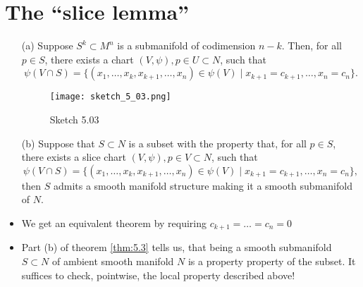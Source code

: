 \section{The ``slice lemma''}

\begin{theorem}\label{thm:5.3}
    \begin{enumerate}
        \item[(a)] Suppose \(S^k\subset M^n\) is a submanifold of codimension \(n-k\).
                   Then, for all \(p\in S\), there exists a chart \((V,\psi),p\in U\subset N\), such that \[\psi(V\cap S)=\{(x_1,\dots,x_k,x_{k+1},\dots,x_n)\in \psi(V)\mid x_{k+1}=c_{k+1},\dots,x_{n}=c_n\}.\]  
        \begin{figure}[H]
            \centering
            \texttt{[image: sketch\_5\_03.png]}
            \caption{Sketch 5.03} 
        \end{figure}
        \item[(b)] Suppose that \(S\subset N\) is a subset with the property that, for all  
                   \(p\in S\), there exists a slice chart \((V,\psi),p\in V\subset N\), such that \[\psi(V\cap S)=\{(x_1,\dots,x_k,x_{k+1},\dots,x_n)\in \psi(V)\mid x_{k+1}=c_{k+1},\dots,x_{n}=c_n\},\]
                   then \(S\) admits a smooth manifold structure making it a smooth submanifold of \(N\).
    \end{enumerate}
\end{theorem}

\begin{remark}
    \begin{itemize}
        \item We get an equivalent theorem by requiring \(c_{k+1}=\dots=c_n=0\)
        \item Part (b) of theorem \ref{thm:5.3} tells us, that being a smooth submanifold \(S\subset N\) of ambient smooth manifold \(N\) is a property 
              property of the subset. It suffices to check, pointwise, the local property described above! 
    \end{itemize}
\end{remark}

